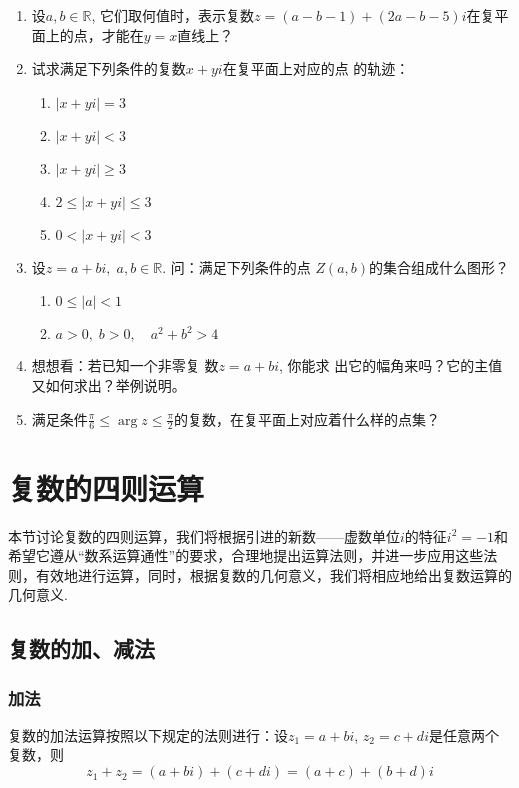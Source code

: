 \begin{enumerate}
\item  设$a,b\in\mathbb{R}$, 它们取何值时，表示复数$z=(a-b-1)+(2a-b-5)i$在复平面上的点，才能在$y=x$直线上？
\item 试求满足下列条件的复数$x+yi$在复平面上对应的点
的轨迹：
\begin{multicols}{3}
\begin{enumerate}[(1)]
    \item $|x+yi|=3$
    \item $|x+yi|<3$
    \item $|x+yi|\ge 3$
    \item $2\le |x+yi|\le 3$
    \item $0<|x+yi|<3$
\end{enumerate}
\end{multicols}
\item 设$z=a+bi,\; a,b\in\mathbb{R}$. 问：满足下列条件的点
$Z(a,b)$的集合组成什么图形？
\begin{multicols}{2}
\begin{enumerate}[(1)]
    \item $0\le |a|<1$
    \item $a>0,\; b>0,\quad a^2+b^2>4$
\end{enumerate}
\end{multicols}

\item 想想看：若已知一个非零复 数$z=a+bi$, 你能求
出它的幅角来吗？它的主值又如何求出？举例说明。

\item 满足条件$\frac{\pi}{6}\le \arg z\le \frac{\pi}{2}$的复数，在复平面上对应着什么样的点集？

\end{enumerate}

\section{复数的四则运算}
本节讨论复数的四则运算，我们将根据引进的新数——虚数单位$i$的特征$i^2=-1$和希望它遵从“数系运算通性”的要求，合理地提出运算法则，并进一步应用这些法则，有效地进行运算，同时，根据复数的几何意义，我们将相应地给出复数运算的几何意义.

\subsection{复数的加、减法}
\subsubsection{加法}
复数的加法运算按照以下规定的法则进行：设$z_1=a+bi$, $z_2=c+di$是任意两个复数，则
\[z_1+z_2=(a+bi)+(c+di)=(a+c)+(b+d)i\]


